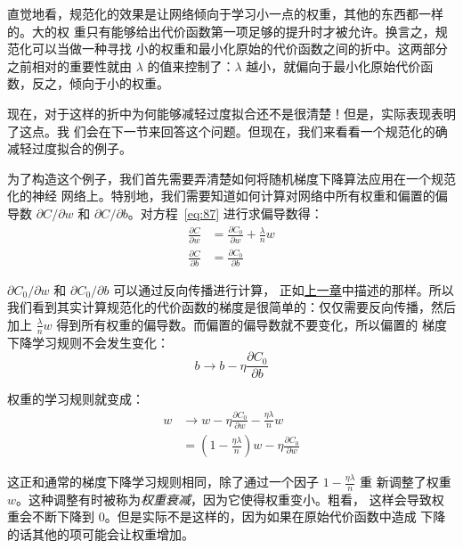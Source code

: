 直觉地看，规范化的效果是让网络倾向于学习小一点的权重，其他的东西都一样的。大的权
重只有能够给出代价函数第一项足够的提升时才被允许。换言之，规范化可以当做一种寻找
小的权重和最小化原始的代价函数之间的折中。这两部分之前相对的重要性就由 $\lambda$
的值来控制了：$\lambda$ 越小，就偏向于最小化原始代价函数，反之，倾向于小的权重。

现在，对于这样的折中为何能够减轻过度拟合还不是很清楚！但是，实际表现表明了这点。我
们会在下一节来回答这个问题。但现在，我们来看看一个规范化的确减轻过度拟合的例子。

为了构造这个例子，我们首先需要弄清楚如何将随机梯度下降算法应用在一个规范化的神经
网络上。特别地，我们需要知道如何计算对网络中所有权重和偏置的偏导数 $\partial
C/\partial w$ 和 $\partial C/\partial b$。对方程~\eqref{eq:87} 进行求偏导数得：
\begin{align}
  \frac{\partial C}{\partial w} & = \frac{\partial C_0}{\partial w} +
                                  \frac{\lambda}{n} w \label{eq:88}\tag{88} \\
  \frac{\partial C}{\partial b} & = \frac{\partial C_0}{\partial b} \label{eq:89}\tag{89}
\end{align}

$\partial C_0/\partial w$ 和 $\partial C_0/\partial b$ 可以通过反向传播进行计算，
正如\hyperref[ch:HowTheBackpropagationAlgorithmWorks]{上一章}中描述的那样。所以
我们看到其实计算规范化的代价函数的梯度是很简单的：仅仅需要反向传播，然后加上
$\frac{\lambda}{n} w$ 得到所有权重的偏导数。而偏置的偏导数就不要变化，所以偏置的
梯度下降学习规则不会发生变化：
\begin{equation}
  b \rightarrow b -\eta \frac{\partial C_0}{\partial b}
  \label{eq:90}\tag{90}
\end{equation}

权重的学习规则就变成：
\begin{align}
  w & \rightarrow w-\eta \frac{\partial C_0}{\partial
      w}-\frac{\eta \lambda}{n} w \label{eq:91}\tag{91}\\
    & = \left(1-\frac{\eta \lambda}{n}\right) w -\eta \frac{\partial
      C_0}{\partial w} \label{eq:92}\tag{92}
\end{align}

这正和通常的梯度下降学习规则相同，除了通过一个因子 $1-\frac{\eta\lambda}{n}$ 重
新调整了权重 $w$。这种调整有时被称为\emph{权重衰减}，因为它使得权重变小。粗看，
这样会导致权重会不断下降到 $0$。但是实际不是这样的，因为如果在原始代价函数中造成
下降的话其他的项可能会让权重增加。

